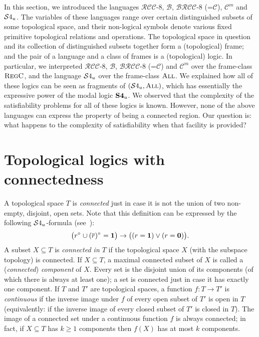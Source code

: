 \documentclass{LMCS}
\theoremstyle{plain}
\newcommand{\cB}{\ensuremath{\mathcal{B}}}\newcommand{\cBc}{\ensuremath{\mathcal{B}c}}\newcommand{\cBcc}{\ensuremath{\mathcal{B}cc}}
\newcommand{\cBC}{\ensuremath{\mathcal{C}}}
\newcommand{\cBCm}{\ensuremath{\mathcal{C}^m}}
\newcommand{\BRCCE}{\ensuremath{\mathcal{BRCC}\text{-}8}}
\newcommand{\RCCE}{\ensuremath{\mathcal{RCC}\text{-}8}}\newcommand{\RCCEcc}{\ensuremath{\RCCE{}cc}}\newcommand{\RCCEc}{\ensuremath{\RCCE{}c}}
\newcommand{\ti}[2][]{#2^{\circ_{#1}}}
\newcommand{\All}{\textsc{All}}
\newcommand{\Regc}{\textsc{RegC}}
\begin{document}
In this section, we introduced the languages $\RCCE$, $\cB$,
$\BRCCE$ (=$\cBC$), $\cBCm$ and $\mathcal{S}4_u$.  The variables
of these languages range over certain distinguished subsets of some
topological space, and their non-logical symbols denote various fixed
primitive topological relations and operations. The topological space
in question and its collection of distinguished subsets together form
a (topological) frame; and the pair of a language and a class of
frames is a (topological) logic. In particular, we interpreted
$\RCCE$, $\cB$, $\BRCCE$ (=$\cBC$) and $\cBCm$ over the frame-class
$\Regc$, and the language $\mathcal{S}4_u$ over the frame-class $\All$. We
explained how all of these logics can be seen as fragments of
$(\SFU,\All)$, which has essentially the expressive power of the modal
logic ${\bf S4}_u$.  We observed that the complexity of the
satisfiability problems for all of these logics is known.  However,
none of the above languages can express the property of being a
connected region. Our question is: what happens to the
complexity of satisfiability when that facility is provided?




\section{Topological logics with connectedness}
\label{sec:with}

A topological space $T$ is \emph{connected} just in case it is not the
union of two non-empty, disjoint, open sets. Note that this definition can be expressed by the following $\mathcal{S}4_u$-formula (see~\cite{Shehtman99}):
\begin{equation*}
\big(\ti{r} \cup \ti{(\overline{r})} = \one\big) \to \big ( (r=\one ) \lor (r = \zero ) \big).
\end{equation*}
A subset $X \subseteq T$
is \emph{connected in $T$} if the topological space $X$ (with the
subspace topology) is connected. If $X \subseteq T$, a maximal
connected subset of $X$ is called a (\emph{connected})
\emph{component} of $X$. Every set is the disjoint union of its
components (of which there is always at least one); a set is connected
just in case it has exactly one component.  If $T$ and $T'$ are
topological spaces, a function $f\colon T \rightarrow T'$ is \emph{continuous}
if the inverse image under $f$ of every open subset of
$T'$ is open in $T$ (equivalently:
if
the inverse image of every closed subset of $T'$ is closed in
$T$).  The image of a connected set under a continuous function $f$ is
always connected;  in fact, if $X \subseteq T$ has $k\geq 1$ components then $f(X)$ has at most $k$ components.
\end{document}
